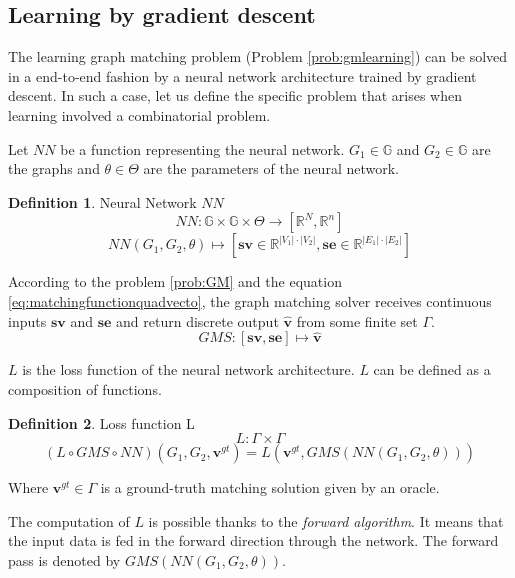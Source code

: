 \documentclass[times,onecolumn,final,authoryear]{article}
\theoremstyle{definition}
\newtheorem{definition}{Definition}
\begin{document}
\subsection{Learning by gradient descent}
The learning graph matching problem (Problem \ref{prob:gmlearning}) can be solved in a end-to-end fashion by a neural network architecture trained by gradient descent. In such a case, let us define the specific problem that arises when learning involved a combinatorial problem. 

Let $NN$ be a function representing the neural network. $G_1 \in \mathbb{G}$ and $G_2 \in \mathbb{G}$ are the graphs and $\theta \in \Theta$ are the parameters of the neural network.
\begin{definition}{Neural Network $NN$}
\begin{equation}
NN : \mathbb{G} \times \mathbb{G} \times \Theta  \to [\mathbb{R}^N,\mathbb{R}^n]
\end{equation}
\begin{equation}
NN(G_1,G_2,\theta)  \mapsto [\mathbf{sv} \in \mathbb{R}^{|V_1| \cdot |V_2|} , \mathbf{se} \in \mathbb{R}^{|E_1| \cdot |E_2|}]
\end{equation}
\end{definition}

According to the problem \ref{prob:GM} and the equation \eqref{eq:matchingfunctionquadvecto}, the graph matching solver receives continuous inputs $\mathbf{sv}$ and $\mathbf{se}$ and return discrete output $\hat{\textbf{v}}$ from some finite set $\Gamma$.
\begin{equation}
GMS :  [\mathbf{sv}, \mathbf{se}]  \mapsto \mathbf{ \hat{v} }
\end{equation}


$L$ is the loss function of the neural network architecture. $L$ can be defined as a composition of functions.
\begin{definition}{Loss function L}
\begin{equation}
L : \Gamma \times \Gamma
\end{equation}
\begin{equation}
(L  \circ GMS \circ NN)(G_1,G_2,\mathbf{v}^{gt})=L(\mathbf{v}^{gt},GMS(NN(G_1,G_2,\theta)))
\end{equation}
\end{definition}
Where $\mathbf{v}^{gt} \in \Gamma$ is a ground-truth matching solution given by an oracle.

The computation of $L$ is possible thanks to the \textit{forward algorithm}. It means that the input data is fed in the forward direction through the network. The forward pass is denoted by $GMS(NN(G_1,G_2,\theta))$.
\end{document}
